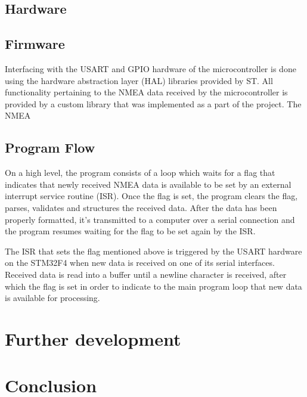 \documentclass[paper=a4, fontsize=12pt]{article} %
\numberwithin{equation}{section}
\numberwithin{figure}{section}
\numberwithin{table}{section}
\begin{document}
\subsection{Hardware} %
\label{sec:hardware}





\subsection{Firmware} %
\label{sec:firmware}

Interfacing with the USART and GPIO hardware of the microcontroller is done using the hardware abstraction layer (HAL) libraries provided by ST. All functionality pertaining to the NMEA data received by the microcontroller is provided by a custom library that was implemented as a part of the project. The NMEA 


\subsection{Program Flow} %
\label{sub:overview}

On a high level, the program consists of a loop which waits for a flag that indicates that newly received NMEA data is available to be set by an external interrupt service routine (ISR). Once the flag is set, the program clears the flag, parses, validates and structures the received data. After the data has been properly formatted, it's transmitted to a computer over a serial connection and the program resumes waiting for the flag to be set again by the ISR.

The ISR that sets the flag mentioned above is triggered by the USART hardware on the STM32F4 when new data is received on one of its serial interfaces. Received data is read into a buffer until a newline character is received, after which the flag is set in order to indicate to the main program loop that new data is available for processing.



\section{Further development} %
\label{sec:further_areas_of_development}


\section{Conclusion} %
\label{sec:conclusion}

\end{document}
